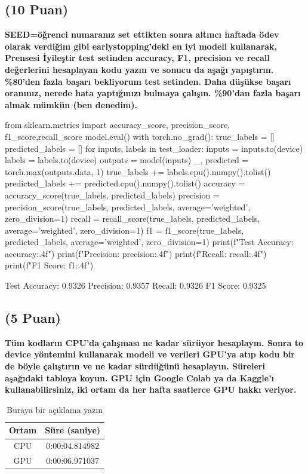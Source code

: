 \documentclass[11pt]{article}
\begin{document}
\newpage
\subsection{(10 Puan)} \textbf{SEED=öğrenci numaranız set ettikten sonra altıncı haftada ödev olarak verdiğim gibi earlystopping'deki en iyi modeli kullanarak, Prensesi İyileştir test setinden accuracy, F1, precision ve recall değerlerini hesaplayan kodu yazın ve sonucu da aşağı yapıştırın. \%80'den fazla başarı bekliyorum test setinden. Daha düşükse başarı oranınız, nerede hata yaptığınızı bulmaya çalışın. \%90'dan fazla başarı almak mümkün (ben denedim).}

\begin{python}
from sklearn.metrics import  accuracy_score, precision_score, f1_score,recall_score
model.eval()
with torch.no_grad():
    true_labels = []
    predicted_labels = []
    for inputs, labels in test_loader:
        inputs = inputs.to(device)
        labels = labels.to(device)
        outputs = model(inputs)
        _, predicted = torch.max(outputs.data, 1)
        true_labels += labels.cpu().numpy().tolist()
        predicted_labels += predicted.cpu().numpy().tolist()
accuracy = accuracy_score(true_labels, predicted_labels)
precision = precision_score(true_labels, predicted_labels, average='weighted', zero_division=1)
recall = recall_score(true_labels, predicted_labels, average='weighted', zero_division=1)
f1 = f1_score(true_labels, predicted_labels, average='weighted', zero_division=1)
print(f"Test Accuracy: {accuracy:.4f}")
print(f"Precision: {precision:.4f}")
print(f"Recall: {recall:.4f}")
print(f"F1 Score: {f1:.4f}")
\end{python}
Test Accuracy: 0.9326
Precision: 0.9357
Recall: 0.9326
F1 Score: 0.9325
\subsection{(5 Puan)} \textbf{Tüm kodların CPU'da çalışması ne kadar sürüyor hesaplayın. Sonra to device yöntemini kullanarak modeli ve verileri GPU'ya atıp kodu bir de böyle çalıştırın ve ne kadar sürdüğünü hesaplayın. Süreleri aşağıdaki tabloya koyun. GPU için Google Colab ya da Kaggle'ı kullanabilirsiniz, iki ortam da her hafta saatlerce GPU hakkı veriyor.}

\begin{table}[ht!]
    \centering
    \caption{Buraya bir açıklama yazın}
    \begin{tabular}{c|c}
        Ortam & Süre (saniye) \\\hline
        CPU & 0:00:04.814982 \\
        GPU & 0:00:06.971037 \\
    \end{tabular}
    \label{tab:my_table}
\end{table}
\end{document}
